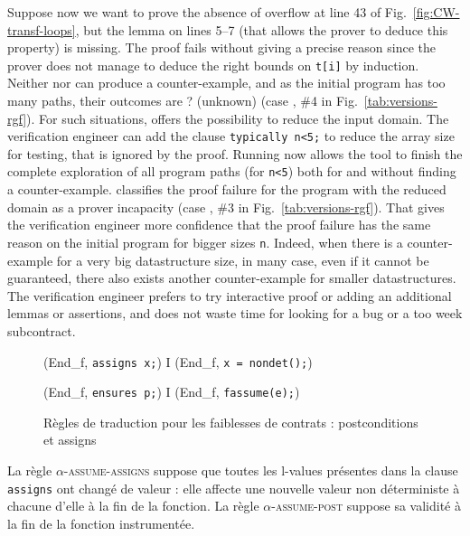 Suppose now we want to prove the absence of overflow at line 43
of Fig.~\ref{fig:CW-transf-loops}, but the lemma on lines 5--7 
(that allows the prover to deduce this property) is missing.
The proof fails  without giving a precise reason since
the prover does not manage to deduce the right bounds on \lstinline{t[i]} by induction.
Neither \NCD nor \CWD can produce a counter-example, and
as the initial program has too many paths, their outcomes are \textsf{?}
(unknown) (case , \#4 in Fig.~\ref{tab:versions-rgf}).
For such situations, \stady offers the possibility to reduce the input domain.
The verification engineer can add the \acsl clause 
\lstinline'typically n<5;' to reduce the array size 
for testing, that is ignored by the proof. 
Running \stady now allows the tool to finish the complete exploration of all
program paths (for \lstinline'n<5') both for \NCD and \CWD without finding a counter-example.
\stady classifies the proof failure for the program with 
the reduced domain as a prover incapacity (case ,
\#3 in Fig.~\ref{tab:versions-rgf}).
That gives the verification engineer more confidence that the proof failure
has the same reason on the initial program for bigger sizes \lstinline{n}.
Indeed, when there is a counter-example for a very big datastructure size, 
in many case,  even if it cannot be guaranteed, 
there also exists another counter-example for smaller datastructures. 
The verification engineer prefers to  try interactive proof or adding an additional lemmas or assertions,
and does not waste time for looking for a bug or a too week subcontract.




\begin{figure}[bt]
  \scriptsize{
    {
      {(End_f, \mbox{\lstinline'assigns x;'})
        I \concat (End_f, \mbox{\lstinline'x = nondet();'})}
    }

    {
      {(End_f, \mbox{\lstinline'ensures p;'})
        I \concat (End_f, \mbox{\lstinline'fassume(e);'})}
    }
  }
  \caption{Règles de traduction pour les faiblesses de contrats :
    postconditions et assigns}
  \label{fig:assume-annot}
\end{figure}

La règle \textsc{$\alpha$-assume-assigns} suppose que toutes les l-values
présentes dans la clause \lstinline'assigns' ont changé de valeur : elle affecte
une nouvelle valeur non déterministe à chacune d'elle à la fin de la fonction.
La règle \textsc{$\alpha$-assume-post} suppose sa validité à la fin de la
fonction instrumentée.


